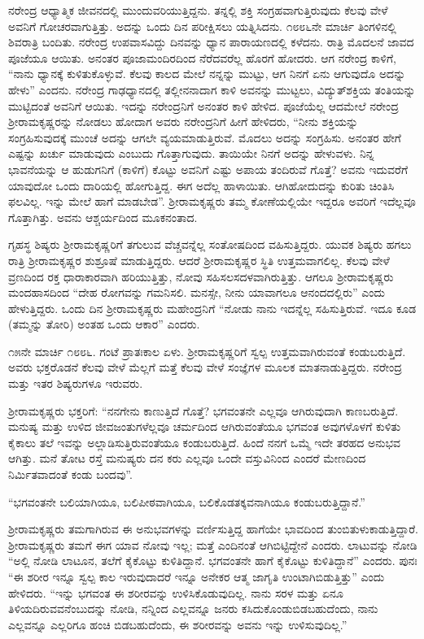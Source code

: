 ನರೇಂದ್ರ ಆಧ್ಯಾತ್ಮಿಕ ಜೀವನದಲ್ಲಿ ಮುಂದುವರಿಯುತ್ತಿದ್ದನು. ತನ್ನಲ್ಲಿ ಶಕ್ತಿ ಸಂಗ್ರಹವಾಗುತ್ತಿರುವುದು ಕೆಲವು ವೇಳೆ ಅವನಿಗೆ ಗೋಚರವಾಗುತ್ತಿತ್ತು. ಅದನ್ನು ಒಂದು ದಿನ ಪರೀಕ್ಷಿಸಲು ಯತ್ನಿಸಿದನು. ೧೮೮೬ನೇ ಮಾರ್ಚಿ ತಿಂಗಳಿನಲ್ಲಿ ಶಿವರಾತ್ರಿ ಬಂದಿತು. ನರೇಂದ್ರ ಉಪವಾಸವಿದ್ದು ದಿನವನ್ನು ಧ್ಯಾನ ಪಾರಾಯಣದಲ್ಲಿ ಕಳೆದನು. ರಾತ್ರಿ ಮೊದಲನೆ ಜಾವದ ಪೂಜೆಯೂ ಆಯಿತು. ಅನಂತರ ಪೂಜಾಮಂದಿರದಿಂದ ನೆರೆದವರೆಲ್ಲ ಹೊರಗೆ ಹೋದರು. ಆಗ ನರೇಂದ್ರ ಕಾಳಿಗೆ, “ನಾನು ಧ್ಯಾನಕ್ಕೆ ಕುಳಿತುಕೊಳ್ಳುವೆ. ಕೆಲವು ಕಾಲದ ಮೇಲೆ ನನ್ನನ್ನು ಮುಟ್ಟು, ಆಗ ನಿನಗೆ ಏನು ಆಗುವುದೊ ಅದನ್ನು ಹೇಳು” ಎಂದನು. ನರೇಂದ್ರ ಗಾಢಧ್ಯಾನದಲ್ಲಿ ತಲ್ಲೀನನಾದಾಗ ಕಾಳಿ ಅವನನ್ನು ಮುಟ್ಟಲು, ವಿದ್ಯುತ್‍ಶಕ್ತಿಯ ತಂತಿಯನ್ನು ಮುಟ್ಟಿದಂತೆ ಅವನಿಗೆ ಆಯಿತು. ಇದನ್ನು ನರೇಂದ್ರನಿಗೆ ಅನಂತರ ಕಾಳಿ ಹೇಳಿದ. ಪೂಜೆಯೆಲ್ಲ ಆದಮೇಲೆ ನರೇಂದ್ರ ಶ‍್ರೀರಾಮಕೃಷ್ಣರನ್ನು ನೋಡಲು ಹೋದಾಗ ಅವರು ನರೇಂದ್ರನಿಗೆ ಹೀಗೆ ಹೇಳಿದರು, “ನೀನು ಶಕ್ತಿಯನ್ನು ಸಂಗ್ರಹಿಸುವುದಕ್ಕೆ ಮುಂಚೆ ಅದನ್ನು ಆಗಲೇ ವ್ಯಯಮಾಡುತ್ತಿರುವೆ. ಮೊದಲು ಅದನ್ನು ಸಂಗ್ರಹಿಸು. ಅನಂತರ ಹೇಗೆ ಎಷ್ಟನ್ನು ಖರ್ಚು ಮಾಡುವುದು ಎಂಬುದು ಗೊತ್ತಾಗುವುದು. ತಾಯಿಯೇ ನಿನಗೆ ಅದನ್ನು ಹೇಳುವಳು. ನಿನ್ನ ಭಾವನೆಯನ್ನು ಆ ಹುಡುಗನಿಗೆ (ಕಾಳಿಗೆ) ಕೊಟ್ಟು ಅವನಿಗೆ ಎಷ್ಟು ಅಪಾಯ ತಂದಿರುವೆ ಗೊತ್ತೆ? ಅವನು ಇದುವರೆಗೆ ಯಾವುದೋ ಒಂದು ದಾರಿಯಲ್ಲಿ ಹೋಗುತ್ತಿದ್ದ. ಈಗ ಅದೆಲ್ಲ ಹಾಳಾಯಿತು. ಆಗಿಹೋದುದನ್ನು ಕುರಿತು ಚಿಂತಿಸಿ ಫಲವಿಲ್ಲ. ಇನ್ನು ಮೇಲೆ ಹಾಗೆ ಮಾಡಬೇಡ”. ಶ‍್ರೀರಾಮಕೃಷ್ಣರು ತಮ್ಮ ಕೋಣೆಯಲ್ಲಿಯೇ ಇದ್ದರೂ ಅವರಿಗೆ ಇದೆಲ್ಲವೂ ಗೊತ್ತಾಗಿತ್ತು. ಅವನು ಆಶ್ಚರ್ಯದಿಂದ ಮೂಕನಂತಾದ.

ಗೃಹಸ್ಥ ಶಿಷ್ಯರು ಶ‍್ರೀರಾಮಕೃಷ್ಣರಿಗೆ ತಗುಲುವ ವೆಚ್ಚವನ್ನೆಲ್ಲ ಸಂತೋಷದಿಂದ ವಹಿಸುತ್ತಿದ್ದರು. ಯುವಕ ಶಿಷ್ಯರು ಹಗಲು ರಾತ್ರಿ ಶ‍್ರೀರಾಮಕೃಷ್ಣರ ಶುಶ್ರೂಷೆ ಮಾಡುತ್ತಿದ್ದರು. ಆದರೆ ಶ‍್ರೀರಾಮಕೃಷ್ಣರ ಸ್ಥಿತಿ ಉತ್ತಮವಾಗಲಿಲ್ಲ. ಕೆಲವು ವೇಳೆ ವ್ರಣದಿಂದ ರಕ್ತ ಧಾರಾಕಾರವಾಗಿ ಹರಿಯುತ್ತಿತ್ತು, ನೋವು ಸಹಿಸಲಸದಳವಾಗಿರುತ್ತಿತ್ತು. ಆಗಲೂ ಶ‍್ರೀರಾಮಕೃಷ್ಣರು ಮಂದಹಾಸದಿಂದ “ದೇಹ ರೋಗವನ್ನು ಗಮನಿಸಲಿ. ಮನಸ್ಸೇ, ನೀನು ಯಾವಾಗಲೂ ಆನಂದದಲ್ಲಿರು” ಎಂದು ಹೇಳುತ್ತಿದ್ದರು. ಒಂದು ದಿನ ಶ‍್ರೀರಾಮಕೃಷ್ಣರು ಮಹೇಂದ್ರನಿಗೆ “ನೋಡು ನಾನು ಇದನ್ನೆಲ್ಲ ಸಹಿಸುತ್ತಿರುವೆ. ಇದೂ ಕೂಡ (ತಮ್ಮನ್ನು ತೋರಿ) ಅಂತಹ ಒಂದು ಆಕಾರ” ಎಂದರು.

೧೫ನೇ ಮಾರ್ಚಿ ೧೮೮೬. ಗಂಟೆ ಪ್ರಾತಃಕಾಲ ಏಳು. ಶ‍್ರೀರಾಮಕೃಷ್ಣರಿಗೆ ಸ್ವಲ್ಪ ಉತ್ತಮವಾಗಿರುವಂತೆ ಕಂಡುಬರುತ್ತಿದೆ. ಅವರು ಭಕ್ತರೊಡನೆ ಕೆಲವು ವೇಳೆ ಮೆಲ್ಲಗೆ ಮತ್ತೆ ಕೆಲವು ವೇಳೆ ಸಂಜ್ಞೆಗಳ ಮೂಲಕ ಮಾತನಾಡುತ್ತಿದ್ದರು. ನರೇಂದ್ರ ಮತ್ತು ಇತರ ಶಿಷ್ಯರುಗಳೂ ಇರುವರು.

ಶ‍್ರೀರಾಮಕೃಷ್ಣರು ಭಕ್ತರಿಗೆ: “ನನಗೇನು ಕಾಣುತ್ತಿದೆ ಗೊತ್ತೆ? ಭಗವಂತನೇ ಎಲ್ಲವೂ ಆಗಿರುವುದಾಗಿ ಕಾಣಬರುತ್ತಿದೆ. ಮನುಷ್ಯ ಮತ್ತು ಉಳಿದ ಜೀವಜಂತುಗಳೆಲ್ಲವೂ ಚರ್ಮದಿಂದ ಆಗಿರುವಂತೆಯೂ ಭಗವಂತ ಅವುಗಳೊಳಗೆ ಕುಳಿತು ಕೈಕಾಲು ತಲೆ ಇವನ್ನು ಅಲ್ಲಾಡಿಸುತ್ತಿರುವಂತೆಯೂ ಕಂಡುಬರುತ್ತಿದೆ. ಹಿಂದೆ ನನಗೆ ಒಮ್ಮೆ ಇದೇ ತರಹದ ಅನುಭವ ಆಗಿತ್ತು. ಮನೆ ತೋಟ ರಸ್ತೆ ಮನುಷ್ಯರು ದನ ಕರು ಎಲ್ಲವೂ ಒಂದೇ ವಸ್ತುವಿನಿಂದ ಎಂದರೆ ಮೇಣದಿಂದ ನಿರ್ಮಿತವಾದಂತೆ ಕಂಡು ಬಂದವು”.

“ಭಗವಂತನೇ ಬಲಿಯಾಗಿಯೂ, ಬಲಿಪೀಠವಾಗಿಯೂ, ಬಲಿಕೊಡತಕ್ಕವ\-ನಾಗಿಯೂ ಕಂಡುಬರುತ್ತಿದ್ದಾನೆ.”

ಶ‍್ರೀರಾಮಕೃಷ್ಣರು ತಮಗಾಗಿರುವ ಈ ಅನುಭವಗಳನ್ನು ವರ್ಣಿಸುತ್ತಿದ್ದ ಹಾಗೆಯೇ ಭಾವದಿಂದ ತುಂಬಿತುಳುಕಾಡುತ್ತಿದ್ದಾರೆ. ಶ‍್ರೀರಾಮಕೃಷ್ಣರು ತಮಗೆ ಈಗ ಯಾವ ನೋವು ಇಲ್ಲ; ಮತ್ತೆ ಎಂದಿನಂತೆ ಆಗಿಬಿಟ್ಟಿದ್ದೇನೆ ಎಂದರು. ಲಾಟುವನ್ನು ನೋಡಿ “ಅಲ್ಲಿ ನೋಡಿ ಲಾಟೂನ, ತಲೆಗೆ ಕೈಕೊಟ್ಟು ಕುಳಿತಿದ್ದಾನೆ. ಭಗವಂತನೇ ಹಾಗೆ ಕೈಕೊಟ್ಟು ಕುಳಿತಿದ್ದಾನೆ” ಎಂದರು. ಪುನಃ “ಈ ಶರೀರ ಇನ್ನೂ ಸ್ವಲ್ಪ ಕಾಲ ಇರುವುದಾದರೆ ಇನ್ನೂ ಅನೇಕರ ಆತ್ಮ ಜಾಗೃತಿ ಉಂಟಾಗಿಬಿಡುತ್ತಿತ್ತು” ಎಂದು ಹೇಳಿದರು. “ಇನ್ನು ಭಗವಂತ ಈ ಶರೀರವನ್ನು ಉಳಿಸಿಕೊಡುವುದಿಲ್ಲ. ನಾನು ಸರಳ ಮತ್ತು ಏನೂ ತಿಳಿಯದಿರುವವನೆಂಬುದನ್ನು ನೋಡಿ, ನನ್ನಿಂದ ಎಲ್ಲವನ್ನೂ ಜನರು ಕಸಿದುಕೊಂಡುಬಿಡಬಹುದೆಂದು, ನಾನು ಎಲ್ಲವನ್ನೂ ಎಲ್ಲರಿಗೂ ಹಂಚಿ ಬಿಡಬಹುದೆಂದು, ಈ ಶರೀರವನ್ನು ಅವನು ಇನ್ನು ಉಳಿಸುವುದಿಲ್ಲ.”

